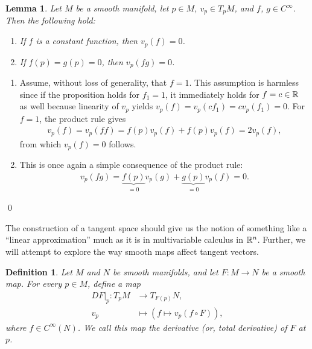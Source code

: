 \documentclass[11pt,a4paper,twoside,openany]{report}
\theoremstyle{my-theorem}
\newtheorem{lemma}[theorem]{Lemma}
\theoremstyle{non-theorem}
\newtheorem{definition}[theorem]{Definition}
\renewenvironment{proof}[1][\proofname]{{\scshape #1. }}{\qed}
\begin{document}
		\begin{lemma}
			\label{lemma:derivatives-properties}
			Let $M$ be a smooth manifold, let $p \in M$, $v_p \in T_pM$, and $f$, $g \in C^\infty$. Then the following hold:
			\begin{enumerate}[label=\rm(\roman*)]
				\item If $f$ is a constant function, then $v_p(f)=0$.
				\item If $f(p) = g(p) = 0$, then $v_p(fg) = 0$.
			\end{enumerate}
		\end{lemma}
	
		\begin{proof}
			\begin{enumerate}[label=\rm(\roman*)]
				\item Assume, without loss of generality, that $f = 1$. This assumption is harmless since if the proposition holds for $f_1 = 1$, it immediately holds for $f = c \in {\mathbb R}$ as well because linearity of $v_p$ yields $v_p(f) = v_p(c f_1) = cv_p(f_1) = 0$. For $f = 1$, the product rule gives
				\begin{align*}
					v_p(f) = v_p(ff) = f(p)v_p(f) + f(p)v_p(f) = 2v_p(f),
				\end{align*}
				from which $v_p(f)=0$ follows.
				
				\item This is once again a simple consequence of the product rule:
				\begin{align*}
					v_p(fg) = \underbrace{f(p)}_{=0}v_p(g) + \underbrace{g(p)}_{=0}v_p(f) = 0.
				\end{align*}
			\end{enumerate}
		\end{proof}
	
		The construction of a tangent space should give us the notion of something like a ``linear approximation'' much as it is in multivariable calculus in ${\mathbb R}^n$. Further, we will attempt to explore the way smooth maps affect tangent vectors.
		\begin{definition}
			Let $M$ and $N$ be smooth manifolds, and let $F:M \to N$ be a smooth map. For every $p \in M$, define a map
			\begin{equation}
				\label{eq:derivative-of-a-smooth-map}
				\begin{aligned}
					DF|_p: T_pM &\to T_{F(p)}N,
				\\
					v_p &\mapsto (f \mapsto v_p(f \circ F)),
				\end{aligned}
			\end{equation}
			where $f \in C^\infty(N)$. We call this map the \emph{derivative} (or, \emph{total derivative}) of $F$ at $p$.
		\end{definition}
		
\end{document}
